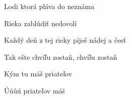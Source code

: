 \begin{song}
\bigskip

   \par
{}   \par
{}     \par

\bigskip

Lodi ktorá pláva do neznáma   \par
{}Rieka zablúdiť nedovolí  \par
{}Každý deň z tej rieky piješ  nádej a česť \par
Tak ešte chvíľu zostaň, chvíľu zostaň \par
{} Kým tu máš priateľov \par

\bigskip

\Refren

\bigskip

 Úúúú priateľov máš \par
{}    

\end{song}
